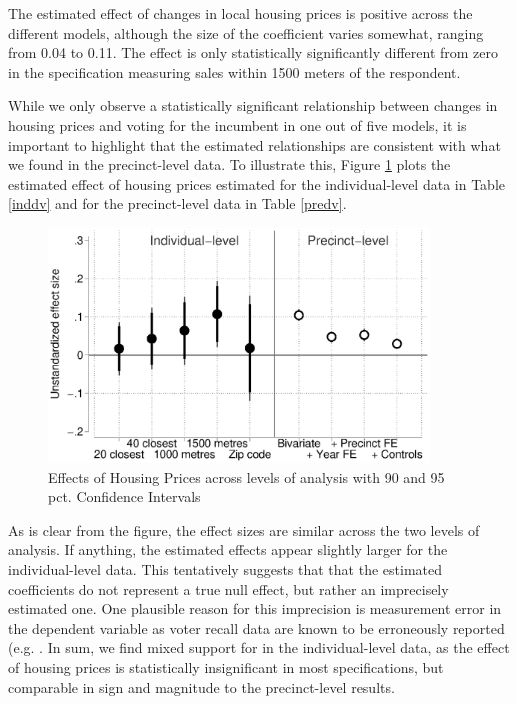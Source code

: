 \documentclass[12pt,a4paper]{article}
\begin{document}
	
	
	The estimated effect of changes in local housing prices is positive across the different models, although the size of the coefficient varies somewhat, ranging from 0.04 to 0.11. The effect is only statistically significantly different from zero in the specification measuring sales within 1500 meters of the respondent.
	
	While we only observe a statistically significant relationship between changes in housing prices and voting for the incumbent in one out of five models, it is important to highlight that the estimated relationships are consistent with what we found in the precinct-level data. To illustrate this, Figure \ref{comparison} plots the estimated effect of housing prices estimated for the individual-level data in Table \ref{inddv} and for the precinct-level data in Table \ref{predv}.
	
	\begin{figure}[htbp!]
		\includegraphics[width=0.9\textwidth]{../figures/comparison.eps}
		\centering
		\caption{Effects of Housing Prices across levels of analysis with 90 and 95 pct. Confidence Intervals}\label{comparison}
	\end{figure}
	
	As is clear from the figure, the effect sizes are similar across the two levels of analysis. If anything, the estimated effects appear slightly larger for the individual-level data. This tentatively suggests that that the estimated coefficients do not represent a true null effect, but rather an imprecisely estimated one. One plausible reason for this imprecision is measurement error in the dependent variable as voter recall data are known to be erroneously reported (e.g. \cite{bernstein2001overreporting}. In sum, we find mixed support for \hone in the individual-level data, as the effect of housing prices is statistically insignificant in most specifications, but comparable in sign and magnitude to the precinct-level results.
	
\end{document}
